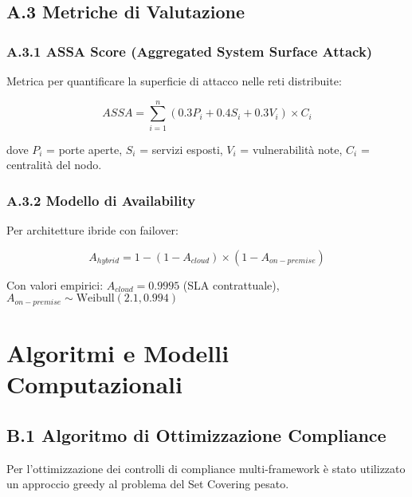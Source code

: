 \section{\texorpdfstring{\textbf{A.3 Metriche di Valutazione}}{A.3 - Metriche di Valutazione}}

\subsection{\texorpdfstring{\textbf{A.3.1 ASSA Score (Aggregated System Surface Attack)}}{A.3.1 - ASSA Score (Aggregated System Surface Attack)}}

Metrica per quantificare la superficie di attacco nelle reti distribuite:

\begin{equation}
ASSA = \sum_{i=1}^{n} \left(0.3 P_i + 0.4 S_i + 0.3 V_i\right) \times C_i
\end{equation}

dove $P_i$ = porte aperte, $S_i$ = servizi esposti, $V_i$ = vulnerabilità note, $C_i$ = centralità del nodo.

\subsection{\texorpdfstring{\textbf{A.3.2 Modello di Availability}}{A.3.2 - Modello di Availability}}

Per architetture ibride con failover:

\begin{equation}
A_{hybrid} = 1 - (1 - A_{cloud}) \times (1 - A_{on-premise})
\end{equation}

Con valori empirici: $A_{cloud} = 0.9995$ (SLA contrattuale), $A_{on-premise} \sim \text{Weibull}(2.1, 0.994)$

\chapter{\texorpdfstring{\textbf{Algoritmi e Modelli Computazionali}}{Appendice B - Algoritmi e Modelli Computazionali}}

\section{\texorpdfstring{\textbf{B.1 Algoritmo di Ottimizzazione Compliance}}{B.1 - Algoritmo di Ottimizzazione Compliance}}

Per l'ottimizzazione dei controlli di compliance multi-framework è stato utilizzato un approccio greedy al problema del Set Covering pesato.

